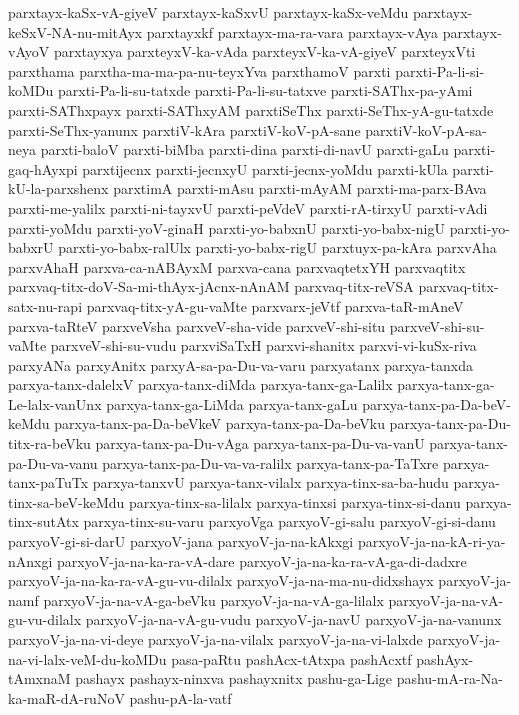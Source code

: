 {parxtayx-kaSx-vA-giyeV
parxtayx-kaSxvU
parxtayx-kaSx-veMdu
parxtayx-keSxV-NA-nu-mitAyx
parxtayxkf
parxtayx-ma-ra-vara
parxtayx-vAya
parxtayx-vAyoV
parxtayxya
parxteyxV-ka-vAda
parxteyxV-ka-vA-giyeV
parxteyxVti
parxthama
parxtha-ma-ma-pa-nu-teyxYva
parxthamoV
parxti
parxti-Pa-li-si-koMDu
parxti-Pa-li-su-tatxde
parxti-Pa-li-su-tatxve
parxti-SAThx-pa-yAmi
parxti-SAThxpayx
parxti-SAThxyAM
parxtiSeThx
parxti-SeThx-yA-gu-tatxde
parxti-SeThx-yanunx
parxtiV-kAra
parxtiV-koV-pA-sane
parxtiV-koV-pA-sa-neya
parxti-baloV
parxti-biMba
parxti-dina
parxti-di-navU
parxti-gaLu
parxti-gaq-hAyxpi
parxtijecnx
parxti-jecnxyU
parxti-jecnx-yoMdu
parxti-kUla
parxti-kU-la-parxshenx
parxtimA
parxti-mAsu
parxti-mAyAM
parxti-ma-parx-BAva
parxti-me-yalilx
parxti-ni-tayxvU
parxti-peVdeV
parxti-rA-tirxyU
parxti-vAdi
parxti-yoMdu
parxti-yoV-ginaH
parxti-yo-babxnU
parxti-yo-babx-nigU
parxti-yo-babxrU
parxti-yo-babx-ralUlx
parxti-yo-babx-rigU
parxtuyx-pa-kAra
parxvAha
parxvAhaH
parxva-ca-nABAyxM
parxva-cana
parxvaqtetxYH
parxvaqtitx
parxvaq-titx-doV-Sa-mi-thAyx-jAcnx-nAnAM
parxvaq-titx-reVSA
parxvaq-titx-satx-nu-rapi
parxvaq-titx-yA-gu-vaMte
parxvarx-jeVtf
parxva-taR-mAneV
parxva-taRteV
parxveVsha
parxveV-sha-vide
parxveV-shi-situ
parxveV-shi-su-vaMte
parxveV-shi-su-vudu
parxviSaTxH
parxvi-shanitx
parxvi-vi-kuSx-riva
parxyANa
parxyAnitx
parxyA-sa-pa-Du-va-varu
parxyatanx
parxya-tanxda
parxya-tanx-dalelxV
parxya-tanx-diMda
parxya-tanx-ga-Lalilx
parxya-tanx-ga-Le-lalx-vanUnx
parxya-tanx-ga-LiMda
parxya-tanx-gaLu
parxya-tanx-pa-Da-beV-keMdu
parxya-tanx-pa-Da-beVkeV
parxya-tanx-pa-Da-beVku
parxya-tanx-pa-Du-titx-ra-beVku
parxya-tanx-pa-Du-vAga
parxya-tanx-pa-Du-va-vanU
parxya-tanx-pa-Du-va-vanu
parxya-tanx-pa-Du-va-va-ralilx
parxya-tanx-pa-TaTxre
parxya-tanx-paTuTx
parxya-tanxvU
parxya-tanx-vilalx
parxya-tinx-sa-ba-hudu
parxya-tinx-sa-beV-keMdu
parxya-tinx-sa-lilalx
parxya-tinxsi
parxya-tinx-si-danu
parxya-tinx-sutAtx
parxya-tinx-su-varu
parxyoVga
parxyoV-gi-salu
parxyoV-gi-si-danu
parxyoV-gi-si-darU
parxyoV-jana
parxyoV-ja-na-kAkxgi
parxyoV-ja-na-kA-ri-ya-nAnxgi
parxyoV-ja-na-ka-ra-vA-dare
parxyoV-ja-na-ka-ra-vA-ga-di-dadxre
parxyoV-ja-na-ka-ra-vA-gu-vu-dilalx
parxyoV-ja-na-ma-nu-didxshayx
parxyoV-ja-namf
parxyoV-ja-na-vA-ga-beVku
parxyoV-ja-na-vA-ga-lilalx
parxyoV-ja-na-vA-gu-vu-dilalx
parxyoV-ja-na-vA-gu-vudu
parxyoV-ja-navU
parxyoV-ja-na-vanunx
parxyoV-ja-na-vi-deye
parxyoV-ja-na-vilalx
parxyoV-ja-na-vi-lalxde
parxyoV-ja-na-vi-lalx-veM-du-koMDu
pasa-paRtu
pashAcx-tAtxpa
pashAcxtf
pashAyx-tAmxnaM
pashayx
pashayx-ninxva
pashayxnitx
pashu-ga-Lige
pashu-mA-ra-Na-ka-maR-dA-ruNoV
pashu-pA-la-vatf
}
